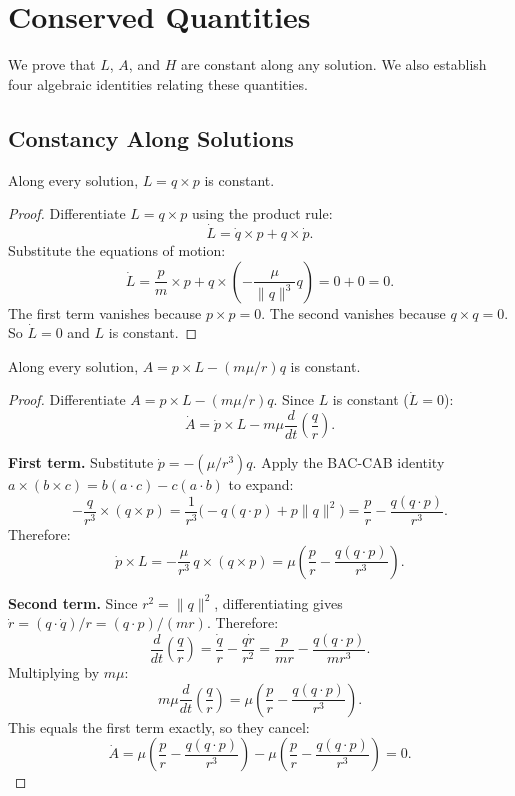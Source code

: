 \chapter{Conserved Quantities}\label{ch:conserved}

We prove that $L$, $A$, and $H$ are constant along any solution.
We also establish four algebraic identities relating these quantities.

\section{Constancy Along Solutions}

\begin{theorem}\label{thm:angular-momentum-const}
Along every solution, $L = q \times p$ is constant.
\leanok
\begin{proof}
Differentiate $L = q \times p$ using the product rule:
\[
  \dot L = \dot q \times p + q \times \dot p.
\]
Substitute the equations of motion:
\[
  \dot L = \frac{p}{m} \times p + q \times \!\left(-\frac{\mu}{\|q\|^3}q\right) = 0 + 0 = 0.
\]
The first term vanishes because $p \times p = 0$.
The second vanishes because $q \times q = 0$.
So $\dot L = 0$ and $L$ is constant.
\end{proof}
\end{theorem}

\begin{theorem}\label{thm:lrl-const}
Along every solution, $A = p \times L - (m\mu/r)q$ is constant.
\leanok
\begin{proof}
Differentiate $A = p \times L - (m\mu/r)q$.
Since $L$ is constant ($\dot L = 0$):
\[
  \dot A = \dot p \times L - m\mu\frac{d}{dt}\!\left(\frac{q}{r}\right).
\]

\textbf{First term.}
Substitute $\dot p = -(\mu/r^3)q$.
Apply the BAC-CAB identity $a \times (b \times c) = b(a \cdot c) - c(a \cdot b)$ to expand:
\[
  -\frac{q}{r^3} \times (q \times p)
  = \frac{1}{r^3}\bigl(-q(q \cdot p) + p\|q\|^2\bigr)
  = \frac{p}{r} - \frac{q(q \cdot p)}{r^3}.
\]
Therefore:
\[
  \dot p \times L = -\frac{\mu}{r^3}\,q \times (q \times p)
  = \mu\!\left(\frac{p}{r} - \frac{q(q \cdot p)}{r^3}\right).
\]

\textbf{Second term.}
Since $r^2 = \|q\|^2$, differentiating gives $\dot r = (q \cdot \dot q)/r = (q \cdot p)/(mr)$.
Therefore:
\[
  \frac{d}{dt}\!\left(\frac{q}{r}\right)
  = \frac{\dot q}{r} - \frac{q\dot r}{r^2}
  = \frac{p}{mr} - \frac{q(q \cdot p)}{mr^3}.
\]
Multiplying by $m\mu$:
\[
  m\mu\frac{d}{dt}\!\left(\frac{q}{r}\right)
  = \mu\!\left(\frac{p}{r} - \frac{q(q \cdot p)}{r^3}\right).
\]
This equals the first term exactly, so they cancel:
\[
  \dot A = \mu\!\left(\frac{p}{r} - \frac{q(q \cdot p)}{r^3}\right)
         - \mu\!\left(\frac{p}{r} - \frac{q(q \cdot p)}{r^3}\right)
         = 0.
\]
\end{proof}
\end{theorem}

